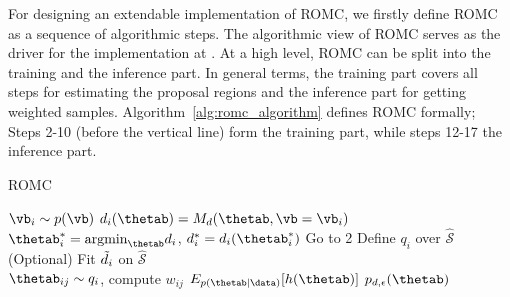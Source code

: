 For designing an extendable implementation of ROMC, we firstly define
ROMC as a sequence of algorithmic steps. The algorithmic view of ROMC
serves as the driver for the implementation at . At a high
level, ROMC can be split into the training and the inference part. In
general terms, the training part covers all steps for estimating the
proposal regions and the inference part for getting weighted
samples. Algorithm~\ref{alg:romc_algorithm} defines ROMC formally;
Steps 2-10 (before the vertical line) form the training part, while
steps 12-17 the inference part.

\begin{algorithm}[!ht]
	\caption{ROMC}\label{alg:romc_algorithm}
	\begin{algorithmic}[1]
      \State $\vb_i \sim p(\vb)$ 
      \State $d_i(\thetab) = M_d(\thetab, \vb=\vb_i)$ 
      \State $\thetab_i^* = \text{argmin}_{\thetab} d_i$, $d_i^*=d_i(\thetab_i^*)$ 
        \State Go to 2 
      \EndIf
      \State Define $q_i$ over $\mathcal{\hat{S}}$ 
      \State (Optional) Fit $\Tilde{d}_i$ on $\mathcal{\hat{S}}$ 
      \\\hrulefill
        \State $\thetab_{ij} \sim q_i$, compute $w_{ij}$ 
      \EndFor
    \EndFor
    \State $E_{p(\thetab|\data)}[h(\thetab)]$ 
    \State $p_{d,\epsilon}(\thetab)$ 
    \EndProcedure
	\end{algorithmic}
\end{algorithm}

